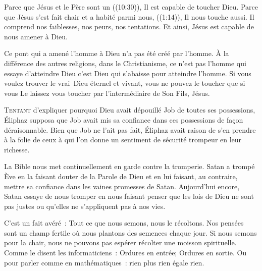 
Parce que Jésus et le Père sont un ((10:30)),
 Il est capable de toucher Dieu.
 Parce que Jésus \Og s'est fait chair et a habité parmi nous, \Fg{}
 ((1:14)), Il nous touche aussi.
 Il comprend nos faiblesses, nos peurs, nos tentations.
 Et ainsi, Jésus est capable de nous amener à Dieu.

Ce pont qui a amené l'homme à Dieu n'a pas été créé par l'homme.
 À la différence des autres religions, dans le Christianisme,
 ce n'est pas l'homme qui essaye d'atteindre Dieu
 \ocadr{}c'est Dieu qui s'abaisse pour atteindre l'homme.
 Si vous voulez trouver le vrai~Dieu éternel et vivant,
 vous ne pouvez le toucher que si vous Le laissez vous toucher
 par l'intermédiaire de Son Fils, Jésus. 

\dvrule






\lettrine{T}{entant} d'expliquer pourquoi Dieu avait dépouillé Job
 de toutes ses possessions, Éliphaz supposa que Job avait mis sa confiance
 dans ces possessions de fa\c{c}on déraisonnable.
 Bien que Job ne l'ait pas fait, Éliphaz avait raison de s'en prendre
 à la folie de ceux à qui l'on donne un sentiment de sécurité trompeur
 en leur richesse. 

La Bible nous met continuellement en garde contre la tromperie.
 Satan a trompé Ève en la faisant douter de la Parole de Dieu
 et en lui faisant, au contraire, mettre sa confiance dans les vaines
 promesses de Satan.
 Aujourd'hui encore, Satan essaye de nous tromper en nous faisant penser
 que les lois de Dieu ne sont pas justes ou qu'elles ne s'appliquent
 pas à nos vies. 


C'est un fait avéré~: Tout ce que nous semons, nous le récoltons.
 Nos pensées sont un champ fertile où nous plantons des semences chaque jour.
 Si nous semons pour la chair, nous ne pouvons pas espérer récolter
 une moisson spirituelle.
 Comme le disent les informaticiens~:
 \Og Ordures en entrée; Ordures en sortie. \Fg{}
 Ou pour parler comme en mathématiques~: rien plus rien égale rien. 

